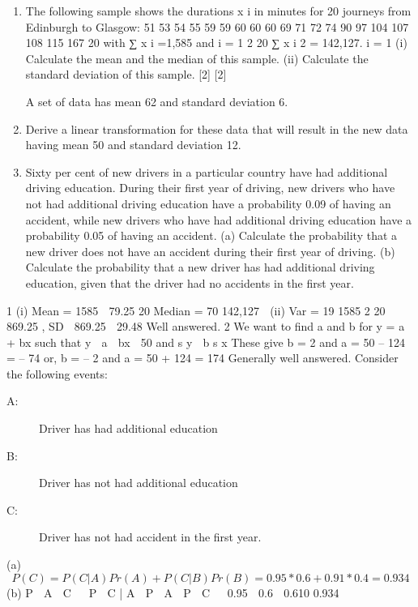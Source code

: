 \documentclass[a4paper,12pt]{article}
\begin{document}
\begin{enumerate}

\item %
The following sample shows the durations x i in minutes for 20 journeys from
Edinburgh to Glasgow:
51 53 54 55 59 59 60 60 60 69 71 72 74 90 97 104 107 108 115 167
20
with
∑ x i =1,585 and
i = 1
2
20
∑ x i 2 = 142,127.
i = 1
(i) Calculate the mean and the median of this sample.
(ii) Calculate the standard deviation of this sample.
[2]
[2]

A set of data has mean 62 and standard deviation 6.

\item Derive a linear transformation for these data that will result in the new data having mean 50 and standard deviation 12.

\item Sixty per cent of new drivers in a particular country have had additional driving education. During their first year of driving, new drivers who have not had additional
driving education have a probability 0.09 of having an accident, while new drivers who have had additional driving education have a probability 0.05 of having an
accident.
(a) Calculate the probability that a new driver does not have an accident during
their first year of driving.
(b) Calculate the probability that a new driver has had additional driving
education, given that the driver had no accidents in the first year.
\end{enumerate}
\newpage
1
(i)
Mean =
1585
 79.25
20
Median = 70
142,127 
(ii)
Var =
19
1585 2
20  869.25 ,
SD  869.25  29.48
Well answered.
2
We want to find a and b for y = a + bx such that
y  a  bx  50 and s y  b s x
These give b = 2 and a = 50 – 124 = – 74
or, b = – 2 and a = 50 + 124 = 174
Generally well answered.
\newpage
Consider the following events:
\begin{description}
\item[A:] Driver has had additional education
\item[B:] Driver has not had additional education
\item[C:] Driver has not had accident in the first year.
\end{description}
(a)
\[P(C) = P(C|A) Pr(A) + P(C|B) Pr(B) = 0.95*0.6 + 0.91*0.4
= 0.934\]
(b)
P  A  C  
P  C | A  P  A 
P  C 

0.95  0.6
 0.610
0.934
\end{document}
